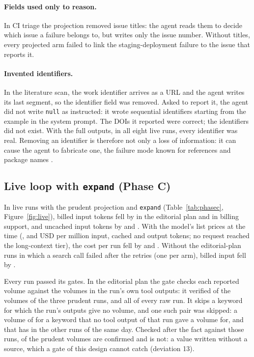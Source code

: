 \paragraph{Fields used only to reason.} In CI triage the projection removed issue titles: the agent reads them to
decide which issue a failure belongs to, but writes only the issue number. Without titles, every projected arm
failed to link the staging-deployment failure to the issue that reports it.

\paragraph{Invented identifiers.} In the literature scan, the work identifier arrives as a URL and the agent writes
its last segment, so the identifier field was removed. Asked to report it, the agent did not write \texttt{null}
as instructed: it wrote sequential identifiers starting from the example in the system prompt. The DOIs it
reported were correct; the identifiers did not exist. With the full outputs, in all eight live runs, every
identifier was real. Removing an identifier is therefore not only a loss of information: it can cause the agent to
fabricate one, the failure mode known for references and package names
\citep{walters2023fabrication,spracklen2025package}.

\subsection{Live loop with \texttt{expand} (Phase C)}
\label{sec:phasec}

In live runs with the prudent projection and \texttt{expand} (Table~\ref{tab:phasec}, Figure~\ref{fig:live}), billed
input tokens fell by \PhaseCChangeInputi{} in the editorial plan and \PhaseCChangeInputiv{} in billing support, and
uncached input tokens by \PhaseCChangeUncachedi{} and \PhaseCChangeUncachediv. With the model's list prices at the
time (\PriceInput, \PriceCached{} and \PriceOutput{} USD per million input, cached and output tokens; no request
reached the long-context tier), the cost per run fell by \PhaseCChangeCosti{} and \PhaseCChangeCostiv. Without the
\PhaseCFailedRunsi{} editorial-plan runs in which a search call failed after the retries (one per arm), billed input
fell by \PhaseCChangeInputNoFaili.

Every run passed its gates. In the editorial plan the gate checks each reported volume against the volumes in the
run's own tool outputs: it verified \RecheckGateChecked{} of the \RecheckPairs{} volumes of the three prudent runs, and
all \RecheckPairs{} of every raw run. It skips a keyword for which the run's outputs give no volume, and one such
pair was skipped: a volume of \RecheckMismatchWritten{} for a keyword that no tool output of that run gave a volume
for, and that has \RecheckMismatchOther{} in the other runs of the same day. Checked after the fact against those
runs, \RecheckConfirmed{} of the \RecheckPairsTotal{} prudent volumes are confirmed and \RecheckMismatch{} is not:
a value written without a source, which a gate of this design cannot catch (deviation 13).

